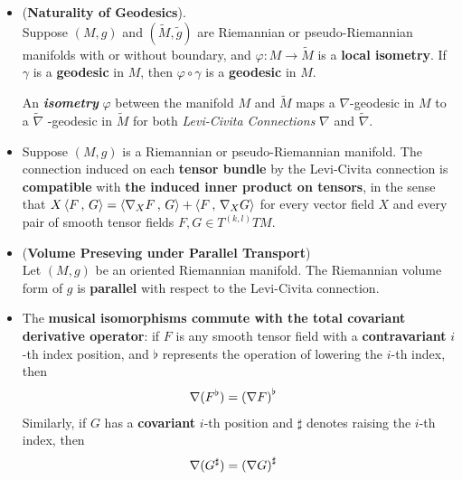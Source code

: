 \documentclass[11pt]{article}
\begin{document}
\begin{itemize}
\item \begin{corollary} (\textbf{Naturality of Geodesics}). \\
Suppose $(M,g)$ and $(\widetilde{M}, \widetilde{g})$ are Riemannian or pseudo-Riemannian manifolds with or without boundary, and $\varphi: M \rightarrow \widetilde{M}$ is a \textbf{local isometry}. If $\gamma$ is a \textbf{geodesic} in $M$, then $\varphi \circ \gamma$ is a \textbf{geodesic} in $M$.
\end{corollary}

\begin{remark} 
An \emph{\textbf{isometry}} $\varphi$ between the manifold $M$ and $ \widetilde{M}$ maps a $\nabla$-geodesic in $M$ to a $\widetilde{\nabla}$ -geodesic in $\widetilde{M}$ for both \emph{Levi-Civita Connections} $\nabla$ and $\widetilde{\nabla}$.
\end{remark}

\item \begin{proposition}
Suppose $(M,g)$ is a Riemannian or pseudo-Riemannian manifold. The connection induced on each \textbf{tensor bundle} by the Levi-Civita connection is \textbf{compatible} with \textbf{the induced inner product on tensors}, in the sense that $X \left\langle F\,,\, G \right\rangle= \left\langle \nabla_{X}{F}\,,\, G \right\rangle + \left\langle F\,,\, \nabla_{X}{G} \right\rangle$ for every vector field $X$ and every pair of smooth tensor fields $F, G \in T^{(k,l)}TM$.
\end{proposition}


\item \begin{proposition} (\textbf{Volume Preseving under Parallel Transport})\\
Let $(M, g)$ be an oriented Riemannian manifold. The Riemannian volume form of $g$ is \textbf{parallel} with respect to the Levi-Civita connection.
\end{proposition}

\item \begin{proposition} 
The \textbf{musical isomorphisms commute with the total covariant derivative operator}: if $F$ is any smooth tensor field with a \textbf{contravariant} $i$-th index
position, and $\flat$ represents the operation of lowering the $i$-th index, then
\begin{align}
\nabla (F^{\flat}) &= \left(\nabla F\right)^{\flat}  \label{eqn: levi_civita_connection_flat_operation}
\end{align}
Similarly, if $G$ has a \textbf{covariant} $i$-th position and $\sharp$ denotes raising the $i$-th index, then
\begin{align}
\nabla (G^{\sharp}) &= \left(\nabla G\right)^{\sharp}  \label{eqn: levi_civita_connection_sharp_operation}
\end{align}
\end{proposition}
\end{itemize}
\end{document}
